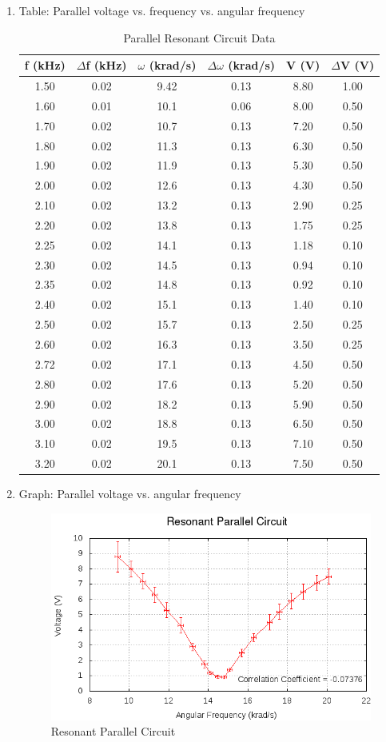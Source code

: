 \begin{enumerate}[resume]
\newpage
\item Table: Parallel voltage vs. frequency vs. angular frequency
\begin{table}[h]
\center
\begin{tabular}{|c|c|c|c|c|c|}
\hline
f (kHz) & $\Delta$f (kHz) & $\omega$ (krad/s) & $\Delta\omega$ (krad/s) & V (V) & $\Delta$V (V)\\
\hline
1.50&0.02&9.42&0.13&8.80&1.00\\
1.60&0.01&10.1&0.06&8.00&0.50\\
1.70&0.02&10.7&0.13&7.20&0.50\\
1.80&0.02&11.3&0.13&6.30&0.50\\
1.90&0.02&11.9&0.13&5.30&0.50\\
2.00&0.02&12.6&0.13&4.30&0.50\\
2.10&0.02&13.2&0.13&2.90&0.25\\
2.20&0.02&13.8&0.13&1.75&0.25\\
2.25&0.02&14.1&0.13&1.18&0.10\\
2.30&0.02&14.5&0.13&0.94&0.10\\
2.35&0.02&14.8&0.13&0.92&0.10\\
2.40&0.02&15.1&0.13&1.40&0.10\\
2.50&0.02&15.7&0.13&2.50&0.25\\
2.60&0.02&16.3&0.13&3.50&0.25\\
2.72&0.02&17.1&0.13&4.50&0.50\\
2.80&0.02&17.6&0.13&5.20&0.50\\
2.90&0.02&18.2&0.13&5.90&0.50\\
3.00&0.02&18.8&0.13&6.50&0.50\\
3.10&0.02&19.5&0.13&7.10&0.50\\
3.20&0.02&20.1&0.13&7.50&0.50\\
\hline
\end{tabular}
\label{tbl:RLCParallel}
\caption{Parallel Resonant Circuit Data}
\end{table}
\item Graph: Parallel voltage vs. angular frequency
  \begin{figure}[h!]
    \includegraphics{RLC-Resonant-Circuits-Parallel-Graph.png}
    \caption{Resonant Parallel Circuit}
    \label{pic:RLCParallel}
  \end{figure}
\end{enumerate}


